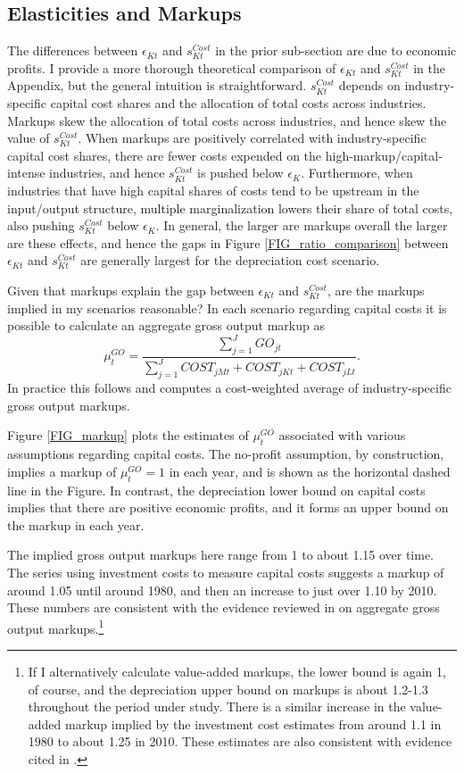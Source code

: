 \documentclass[11pt]{article}
\begin{document}
\subsection{Elasticities and Markups}
The differences between $\epsilon_{Kt}$ and $s^{Cost}_{Kt}$ in the prior sub-section are due to economic profits. I provide a more thorough theoretical comparison of $\epsilon_{Kt}$ and $s^{Cost}_{Kt}$ in the Appendix, but the general intuition is straightforward. $s^{Cost}_{Kt}$ depends on industry-specific capital cost shares and the allocation of total costs across industries. Markups skew the allocation of total costs across industries, and hence skew the value of $s^{Cost}_{Kt}$. When markups are positively correlated with industry-specific capital cost shares, there are fewer costs expended on the high-markup/capital-intense industries, and hence $s^{Cost}_{Kt}$ is pushed below $\epsilon_K$. Furthermore, when industries that have high capital shares of costs tend to be upstream in the input/output structure, multiple marginalization lowers their share of total costs, also pushing $s^{Cost}_{Kt}$ below $\epsilon_K$. In general, the larger are markups overall the larger are these effects, and hence the gaps in Figure \ref{FIG_ratio_comparison} between $\epsilon_{Kt}$ and $s^{Cost}_{Kt}$ are generally largest for the depreciation cost scenario.

Given that markups explain the gap between $\epsilon_{Kt}$ and $s^{Cost}_{Kt}$, are the markups implied in my scenarios reasonable? In each scenario regarding capital costs it is possible to calculate an aggregate gross output markup as
\begin{equation}
    \mu^{GO}_{t} = \frac{\sum_{j=1}^{J} GO_{jt}}{\sum_{j=1}^J COST_{jMt} + COST_{jKt} + COST_{jLt}}. \label{EQ_markup}
\end{equation}
In practice this follows \cite{edmondetal2018} and computes a cost-weighted average of industry-specific gross output markups.

Figure \ref{FIG_markup} plots the estimates of $\mu^{GO}_t$ associated with various assumptions regarding capital costs. The no-profit assumption, by construction, implies a markup of $\mu^{GO}_t = 1$ in each year, and is shown as the horizontal dashed line in the Figure. In contrast, the depreciation lower bound on capital costs implies that there are positive economic profits, and it forms an upper bound on the markup in each year.

The implied gross output markups here range from 1 to about 1.15 over time. The series using investment costs to measure capital costs suggests a markup of around 1.05 until around 1980, and then an increase to just over 1.10 by 2010. These numbers are consistent with the evidence reviewed in \cite{basu2019} on aggregate gross output markups.\footnote{If I alternatively calculate value-added markups, the lower bound is again 1, of course, and the depreciation upper bound on markups is about 1.2-1.3 throughout the period under study. There is a similar increase in the value-added markup implied by the investment cost estimates from around 1.1 in 1980 to about 1.25 in 2010. These estimates are also consistent with evidence cited in \cite{basu2019}.}
\end{document}
